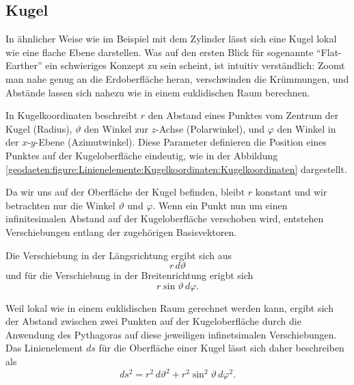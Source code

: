 %
%
%
%
\subsection{Kugel\label{geodaeten:section:Linienelement:Kugel}}
In ähnlicher Weise wie im Beispiel mit dem Zylinder lässt sich eine Kugel lokal wie eine flache Ebene darstellen.
Was auf den ersten Blick für sogenannte ``Flat-Earther'' ein schwieriges Konzept zu sein scheint, ist intuitiv verständlich:
%
Zoomt man nahe genug an die Erdoberfläche heran, verschwinden die Krümmungen, und Abstände lassen sich nahezu wie in einem euklidischen Raum berechnen.

In Kugelkoordinaten beschreibt $r$ den Abstand eines Punktes vom Zentrum der Kugel (Radius), $\vartheta$ den Winkel zur $z$-Achse (Polarwinkel), und $\varphi$ den Winkel in der $x$-$y$-Ebene (Azimutwinkel).
%
%
%
Diese Parameter definieren die Position eines Punktes auf der Kugeloberfläche eindeutig, wie in der Abbildung \ref{geodaeten:figure:Linienelemente:Kugelkoordinaten:Kugelkoordinaten} dargestellt.

Da wir uns auf der Oberfläche der Kugel befinden, bleibt $r$ konstant und wir betrachten nur die Winkel $\vartheta$ und $\varphi$.
Wenn ein Punkt nun um einen infinitesimalen Abstand auf der Kugeloberfläche verschoben wird, entstehen Verschiebungen entlang der zugehörigen Basisvektoren. 

Die Verschiebung in der Längsrichtung ergibt sich aus
\begin{equation}
	r \, d\vartheta
\end{equation}
und für die Verschiebung in der Breitenrichtung erigbt sich
\begin{equation}
	r \sin\vartheta \, d\varphi.
\end{equation}

Weil lokal wie in einem euklidischen Raum gerechnet werden kann, ergibt sich der Abstand zwischen zwei Punkten auf der Kugeloberfläche durch die Anwendung des Pythagoras auf diese jeweiligen infinetsimalen Verschiebungen. 
Das Linienelement $ds$ für die Oberfläche einer Kugel lässt sich daher beschreiben als
%
%
%
\begin{equation}
ds^2 = r^2 \, d\vartheta^2 + r^2 \sin^2\vartheta \, d\varphi^2.
\end{equation}


